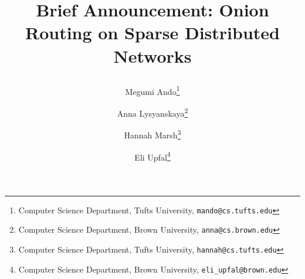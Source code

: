 \newif \iftheory 

\theorytrue %

\newif \ifblind

\blindtrue \blindfalse

\newcommand{\eli}[1]{\textcolor{blue}{[Eli: #1]}}
\newcommand{\meg}[1]{\textcolor{red}{[Megumi: #1]}}
\newcommand{\hannah}[1]{\textcolor{magenta}{[Hannah: #1]}}


\newcommand{\authorlist}{
Megumi Ando\iftheory\thanks{Computer Science Department, Tufts University, {\tt mando@cs.tufts.edu}}\fi
\and 
Anna Lysyanskaya\iftheory\thanks{Computer Science Department, Brown University, {\tt anna@cs.brown.edu}}\fi
\and 
Hannah Marsh\iftheory\thanks{Computer Science Department, Tufts University, {\tt hannah@cs.tufts.edu}}\fi
\and
Eli Upfal\iftheory\thanks{Computer Science Department, Brown University, {\tt eli\_upfal@brown.edu}}\fi
}

\newcommand{\institutelist}{}


\newcommand{\titlelist}{\iftheory\begin{bf}\fi
Brief Announcement: Onion Routing on Sparse Distributed Networks
\iftheory\end{bf}\fi}

\newcommand{\pathstyles}{./stylefiles}

\newcommand{\pathpreambles}{./preambles}

\newcommand{\pathbibs}{./bibfiles}



\iftheory
\documentclass[11pt]{article}

\else
\documentclass[runningheads,a4paper]{llncs}
\ifblind 
\institute{}
\else
\institute{\institutelist}
\fi
\fi

\ifblind 
\author{}
\else
\author{\authorlist} 
\fi
\pagestyle{plain}

\title{\titlelist}






\maketitle
\iftheory
\thispagestyle{empty}
\fi

